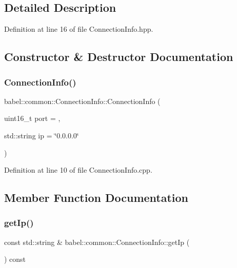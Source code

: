 \subsection{Detailed Description}


Definition at line 16 of file Connection\+Info.\+hpp.



\subsection{Constructor \& Destructor Documentation}
\mbox{\label{classbabel_1_1common_1_1_connection_info_a72b5b676e67bc2ea0bf42354b12e7843}} 
\subsubsection{\texorpdfstring{Connection\+Info()}{ConnectionInfo()}}
{\footnotesize\ttfamily babel\+::common\+::\+Connection\+Info\+::\+Connection\+Info (\begin{DoxyParamCaption}\item[{uint16\+\_\+t}]{port = {},  }\item[{std\+::string}]{ip = {\ttfamily \char`\"{}0.0.0.0\char`\"{}} }\end{DoxyParamCaption})\hspace{0.3cm}{\ttfamily [explicit]}}



Definition at line 10 of file Connection\+Info.\+cpp.



\subsection{Member Function Documentation}
\mbox{\label{classbabel_1_1common_1_1_connection_info_a218d1756c060abaaa9d2390f65031f66}} 
\subsubsection{\texorpdfstring{get\+Ip()}{getIp()}}
{\footnotesize\ttfamily const std\+::string \& babel\+::common\+::\+Connection\+Info\+::get\+Ip (\begin{DoxyParamCaption}{ }\end{DoxyParamCaption}) const}



